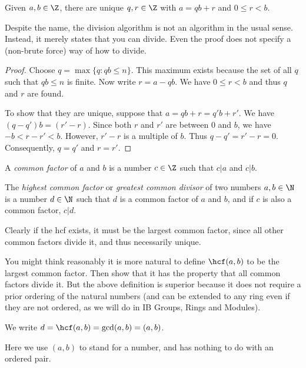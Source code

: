 \documentclass[a4paper]{article}
\begin{document}
\begin{thm}
  Given $a, b\in \Z$, there are unique $q, r\in \Z$ with $a = qb + r$ and $0\leq r < b$.
\end{thm}
Despite the name, the division algorithm is not an algorithm in the usual sense. Instead, it merely states that you can divide. Even the proof does not specify a (non-brute force) way of how to divide.

\begin{proof}
  Choose $q = \max\{q:qb \leq n\}$. This maximum exists because the set of all $q$ such that $qb\leq n$ is finite. Now write $r = a - qb$. We have $0\leq r < b$ and thus $q$ and $r$ are found.

  To show that they are unique, suppose that $a = qb + r = q'b + r'$. We have $(q - q')b = (r' - r)$. Since both $r$ and $r'$ are between $0$ and $b$, we have $-b < r - r' < b$. However, $r' - r$ is a multiple of $b$. Thus $q - q' = r' - r = 0$. Consequently, $q = q'$ and $r = r'$.
\end{proof}

\begin{defi}
  A \emph{common factor} of $a$ and $b$ is a number $c\in\Z$ such that $c|a$ and $c|b$.
\end{defi}

\begin{defi}
  The \emph{highest common factor} or \emph{greatest common divisor} of two numbers $a, b\in \N$ is a number $d\in \N$ such that $d$ is a common factor of $a$ and $b$, and if $c$ is also a common factor, $c|d$.
\end{defi}
Clearly if the hcf exists, it must be the largest common factor, since all other common factors divide it, and thus necessarily unique.

You might think reasonably it is more natural to define $\hcf(a, b)$ to be the largest common factor. Then show that it has the property that all common factors divide it. But the above definition is superior because it does not require a prior ordering of the natural numbers (and can be extended to any ring even if they are not ordered, as we will do in IB Groups, Rings and Modules).


\begin{notation}
  We write $d = \hcf(a, b) = \gcd(a, b) = (a, b)$.

  Here we use $(a, b)$ to stand for a number, and has nothing to do with an ordered pair.
\end{notation}
\end{document}
